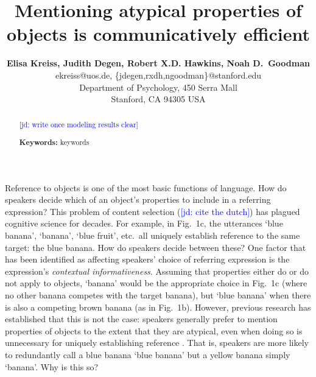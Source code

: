 \documentclass[10pt,letterpaper]{article}
\title{Mentioning atypical properties of objects is communicatively efficient}
\author{{\large \bf Elisa Kreiss, Judith Degen, Robert X.D. Hawkins, Noah D.~Goodman} \\
  ekreiss@uos.de, \{jdegen,rxdh,ngoodman\}@stanford.edu\\
  Department of Psychology, 450 Serra Mall \\
  Stanford, CA 94305 USA}
\newcommand{\jd}[1]{\textcolor{Blue}{[jd: #1]}}
\begin{document}
\maketitle


\begin{abstract}

\jd{write once modeling results clear}

\textbf{Keywords:} 
keywords
\end{abstract}


Reference to objects is one of the most basic functions of language. How do speakers decide which of an object's properties to include in a referring expression? This problem of content selection (\jd{cite the dutch}) has plagued cognitive science for decades. For example, in Fig.~1c, the utterances `blue banana', `banana', `blue fruit', etc.~all uniquely establish reference to the same target: the blue banana. How do speakers decide between these? One factor that has been identified as affecting speakers' choice of referring expression is the expression's \emph{contextual informativeness}. Assuming that properties either do or do not apply to objects, `banana' would be the appropriate choice in Fig.~1c (where no other banana competes with the target banana), but `blue banana' when there is also a competing brown banana (as in Fig.~1b). However, previous research has established that this is not the case: speakers generally prefer to mention properties of objects to the extent that they are atypical, even when doing so is unnecessary for uniquely establishing reference \cite{sedivy2003a, Mitchell2013, westerbeek2015, rubiofernandez2016}. That is, speakers are more likely to redundantly call a blue banana `blue banana' but a yellow banana simply `banana'. Why is this so?

\end{document}
